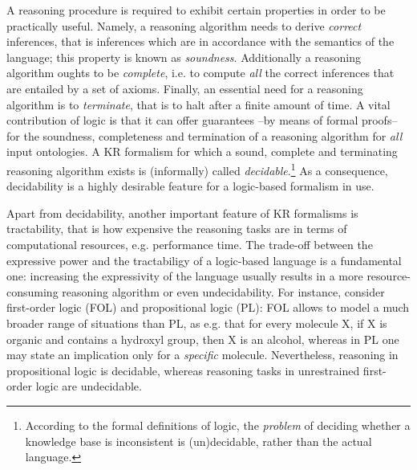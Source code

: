 \documentclass[10pt]{bmc_article}
\newenvironment{bmcformat}{\baselineskip20pt\sloppy\setboolean{publ}{false}}{\baselineskip20pt\sloppy}
\begin{document}
\begin{bmcformat}
A reasoning procedure is required to exhibit certain properties in order to be practically useful. Namely, a reasoning algorithm needs to derive \emph{correct} inferences, that is inferences which are in accordance with the semantics of the language; this property is known as \emph{soundness}. Additionally a reasoning algorithm oughts to be \emph{complete}, i.e. to compute \emph{all} the correct inferences that are entailed by a set of axioms. Finally, an essential need for a reasoning algorithm is to \emph{terminate}, that is to halt after a finite amount of time. A vital contribution of logic is that it can offer guarantees --by means of formal proofs-- for the soundness, completeness and termination of a reasoning algorithm for \emph{all} input ontologies. A KR formalism for which a sound, complete and terminating reasoning algorithm exists is (informally) called \emph{decidable}.\footnote{According to the formal definitions of logic, the \emph{problem} of deciding whether a knowledge base is inconsistent is (un)decidable, rather than the actual language.} As a consequence, decidability is a highly desirable feature for a logic-based formalism in use.

Apart from decidability, another important feature of KR formalisms is tractability, that is how expensive the reasoning tasks are in terms of computational resources, e.g. performance time. The trade-off between the expressive power and the tractabiligy of a logic-based language  is a fundamental one: increasing the expressivity of the language usually results in a more resource-consuming reasoning algorithm or even undecidability. For instance, consider first-order logic (FOL) and propositional logic (PL): FOL allows to model a much broader range of situations than PL, as e.g. that for every molecule X, if X is organic and contains a hydroxyl group, then X is an alcohol, whereas in PL one may state an implication only for a \emph{specific} molecule. Nevertheless, reasoning in propositional logic is decidable, whereas reasoning tasks in unrestrained first-order logic are undecidable.


\end{bmcformat}
\end{document}
